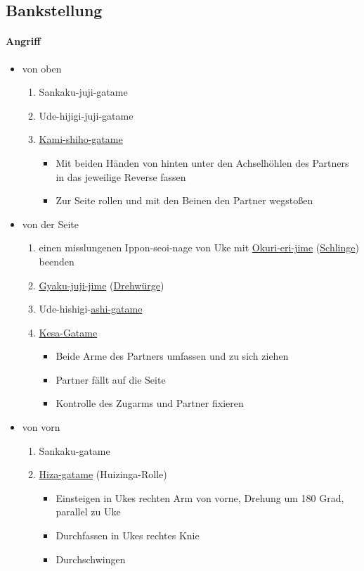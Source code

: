 \documentclass[justified, a4paper, notitlepage, captions=tableheading, nobib]{tufte-handout}
\begin{document}
\subsection{\label{orgf15b76f}Bankstellung }
\label{sec:org1ee8124}
\paragraph{Angriff}
\label{sec:org6975ef4}
\begin{itemize}
\item von oben
\begin{enumerate}
\item Sankaku-juji-gatame
\item Ude-hijigi-juji-gatame
\item \hyperref[org450423b]{Kami-shiho-gatame}
\begin{itemize}
\item Mit beiden Händen von hinten unter den Achselhöhlen des Partners in das jeweilige Reverse fassen
\item Zur Seite rollen und mit den Beinen den Partner wegstoßen
\end{itemize}
\end{enumerate}
\item von der Seite
\begin{enumerate}
\item einen misslungenen Ippon-seoi-nage von Uke mit \hyperref[org55ecd66]{Okuri-eri-jime} (\hyperref[orgd82ac5e]{Schlinge}) beenden
\item \hyperref[org8d8f888]{Gyaku-juji-jime} (\hyperref[org58795e5]{Drehwürge})
\item Ude-hishigi-\hyperref[org6644df8]{ashi-gatame}
\item \hyperref[org5004057]{Kesa-Gatame}
\begin{itemize}
\item Beide Arme des Partners umfassen und zu sich ziehen
\item Partner fällt auf die Seite
\item Kontrolle des Zugarms und Partner fixieren
\end{itemize}
\end{enumerate}
\item von vorn
\begin{enumerate}
\item Sankaku-gatame
\item \hyperref[orgbe98664]{Hiza-gatame} (Huizinga-Rolle)
\begin{itemize}
\item Einsteigen in Ukes rechten Arm von vorne, Drehung um 180 Grad, parallel zu Uke
\item Durchfassen in Ukes rechtes Knie
\item Durchschwingen
\end{itemize}
\end{enumerate}
\end{itemize}
\end{document}
